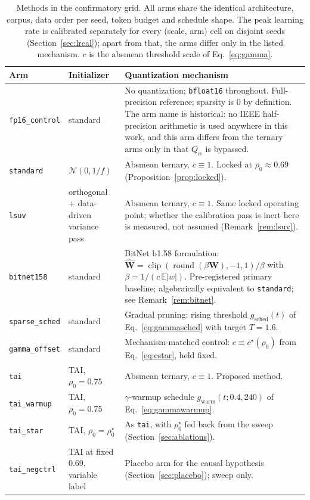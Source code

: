 \documentclass[final,5p,times,twocolumn]{elsarticle}
\theoremstyle{remark}
\newcommand{\E}{\mathbb{E}}
\newcommand{\Wm}{\mathbf{W}}
\newcommand{\rhoz}{\rho_{0}}
\newcommand{\clip}{\operatorname{clip}}
\newcommand{\round}{\operatorname{round}}
\begin{document}
\begin{table}[t]
\centering
\small
\caption{Methods in the confirmatory grid. All arms share the identical
architecture, corpus, data order per seed, token budget and schedule shape. The
peak learning rate is calibrated separately for every (scale, arm) cell on
disjoint seeds (Section~\ref{sec:lrcal}); apart from that, the arms differ only
in the listed mechanism. $c$ is the absmean threshold scale of
Eq.~\eqref{eq:gamma}.}
\label{tab:arms}
\begin{tabular}{@{}p{2.4cm}p{2.8cm}p{7.0cm}@{}}
\toprule
Arm & Initializer & Quantization mechanism \\
\midrule
\texttt{fp16\_control} & standard &
No quantization; \texttt{bfloat16} throughout. Full-precision reference;
sparsity is $0$ by definition. The arm name is historical: no IEEE
half-precision arithmetic is used anywhere in this work, and this arm differs
from the ternary arms only in that $Q_{w}$ is bypassed. \\
\addlinespace
\texttt{standard} & $\mathcal{N}(0, 1/f)$ &
Absmean ternary, $c \equiv 1$. Locked at $\rhoz \approx 0.69$
(Proposition~\ref{prop:locked}). \\
\addlinespace
\texttt{lsuv} & orthogonal $+$ data-driven variance pass &
Absmean ternary, $c \equiv 1$. Same locked operating point; whether the
calibration pass is inert here is measured, not assumed
(Remark~\ref{rem:lsuv}). \\
\addlinespace
\texttt{bitnet158} & standard &
BitNet b1.58 formulation: $\widehat{\Wm} = \clip(\round(\beta\Wm),-1,1)/\beta$
with $\beta = 1/(c\,\E|w|)$. Pre-registered primary baseline; algebraically
equivalent to \texttt{standard}; see Remark~\ref{rem:bitnet}. \\
\addlinespace
\texttt{sparse\_sched} & standard &
Gradual pruning: rising threshold $g_{\mathrm{sched}}(t)$ of
Eq.~\eqref{eq:gammasched} with target $T=1.6$. \\
\addlinespace
\texttt{gamma\_offset} & standard &
Mechanism-matched control: $c \equiv c^{\star}(\rhoz)$ from
Eq.~\eqref{eq:cstar}, held fixed. \\
\addlinespace
\texttt{tai} & TAI, $\rhoz = 0.75$ &
Absmean ternary, $c \equiv 1$. Proposed method. \\
\addlinespace
\texttt{tai\_warmup} & TAI, $\rhoz = 0.75$ &
$\gamma$-warmup schedule $g_{\mathrm{warm}}(t; 0.4, 240)$ of
Eq.~\eqref{eq:gammawarmup}. \\
\addlinespace
\texttt{tai\_star} & TAI, $\rhoz = \rhoz^{\star}$ &
As \texttt{tai}, with $\rhoz^{\star}$ fed back from the sweep
(Section~\ref{sec:ablations}). \\
\midrule
\texttt{tai\_negctrl} & TAI at fixed $0.69$, variable label &
Placebo arm for the causal hypothesis (Section~\ref{sec:placebo}); sweep only. \\
\bottomrule
\end{tabular}
\end{table}
\end{document}
